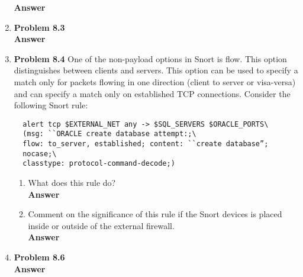 \documentclass[12pt]{article}
\begin{document}
\begin{enumerate}
  \textbf{Answer} \\

  \item \textbf{Problem 8.3} \\

  \textbf{Answer} \\

  \item \textbf{Problem 8.4} One of the non-payload options in Snort is flow. This option distinguishes between clients and servers. This option can be used to specify a match only for packets flowing in one direction (client to server or visa-versa) and can specify a match only on established TCP connections. Consider the following Snort rule: \\

  {\color{blue}
  \begin{verbatim}
  alert tcp $EXTERNAL_NET any -> $SQL_SERVERS $ORACLE_PORTS\
  (msg: ``ORACLE create database attempt:;\
  flow: to_server, established; content: ``create database”;
  nocase;\
  classtype: protocol-command-decode;)
  \end{verbatim}
  }

  \begin{enumerate}
  \item {What does this rule do?} \\

  \textbf{Answer} \\

  \item {Comment on the significance of this rule if the Snort devices is placed inside or outside of the external firewall.} \\

  \textbf{Answer} \\

  \end{enumerate}

  \item \textbf{Problem 8.6}\\

  \textbf{Answer} \\


\end{enumerate}
\end{document}
